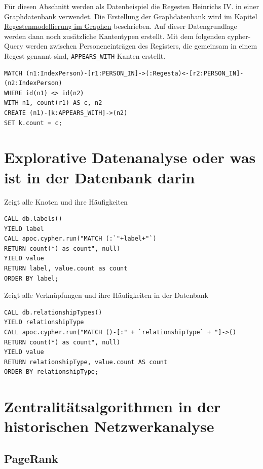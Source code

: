 \documentclass[ngerman,]{scrreprt}
\begin{document}
Für diesen Abschnitt werden als Datenbeispiel die Regesten Heinrichs IV. in einer Graphdatenbank verwendet. Die Erstellung der Graphdatenbank wird im Kapitel \href{20_Regestenmodellierung-im-Graphen.md}{Regestenmodellierung im Graphen} beschrieben. Auf dieser Datengrundlage werden dann noch zusätzliche Kantentypen erstellt. Mit dem folgenden cypher-Query werden zwischen Personeneinträgen des Registers, die gemeinsam in einem Regest genannt sind, \texttt{APPEARS\_WITH}-Kanten erstellt.

\begin{verbatim}
MATCH (n1:IndexPerson)-[r1:PERSON_IN]->(:Regesta)<-[r2:PERSON_IN]-(n2:IndexPerson)
WHERE id(n1) <> id(n2)
WITH n1, count(r1) AS c, n2
CREATE (n1)-[k:APPEARS_WITH]->(n2)
SET k.count = c;
\end{verbatim}

\section{Explorative Datenanalyse oder was ist in der Datenbank darin}\label{explorative-datenanalyse-oder-was-ist-in-der-datenbank-darin}

Zeigt alle Knoten und ihre Häufigkeiten

\begin{verbatim}
CALL db.labels()
YIELD label
CALL apoc.cypher.run("MATCH (:`"+label+"`)
RETURN count(*) as count", null)
YIELD value
RETURN label, value.count as count
ORDER BY label;
\end{verbatim}

Zeigt alle Verknüpfungen und ihre Häufigkeiten in der Datenbank

\begin{verbatim}
CALL db.relationshipTypes()
YIELD relationshipType
CALL apoc.cypher.run("MATCH ()-[:" + `relationshipType` + "]->()
RETURN count(*) as count", null)
YIELD value
RETURN relationshipType, value.count AS count
ORDER BY relationshipType;
\end{verbatim}

\section{Zentralitätsalgorithmen in der historischen Netzwerkanalyse}\label{zentralituxe4tsalgorithmen-in-der-historischen-netzwerkanalyse}

\subsection{PageRank}\label{pagerank}
\end{document}
